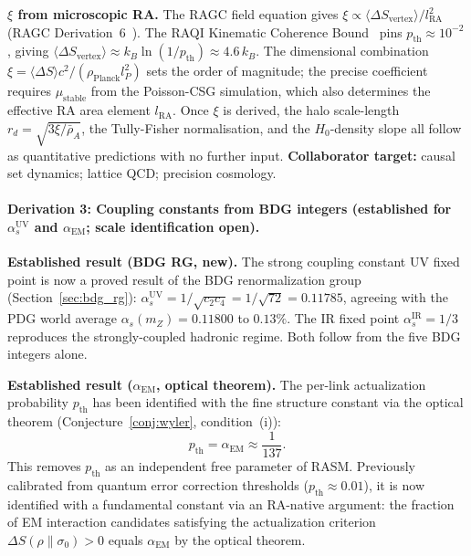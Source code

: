 \documentclass[11pt,a4paper]{article}
\begin{document}
\textbf{$\xi$ from microscopic RA.}
The RAGC field equation gives
$\xi \propto \langle\Delta S_{\mathrm{vertex}}\rangle / l_{\mathrm{RA}}^2$
(RAGC Derivation~6~\citep{Sandeman2026RAGC}).
The RAQI Kinematic Coherence Bound~\citep{Sandeman2026RAQI} pins
$p_{\mathrm{th}} \approx 10^{-2}$, giving
$\langle\Delta S_{\mathrm{vertex}}\rangle \approx k_B \ln(1/p_{\mathrm{th}})
\approx 4.6\,k_B$.
The dimensional combination $\xi = \langle\Delta S\rangle c^2 /
(\rho_{\mathrm{Planck}} l_P^2)$ sets the order of magnitude; the precise
coefficient requires $\mu_{\mathrm{stable}}$ from the Poisson-CSG simulation,
which also determines the effective RA area element $l_{\mathrm{RA}}$.
Once $\xi$ is derived, the halo scale-length $r_d = \sqrt{3\xi/\bar\rho_A}$,
the Tully-Fisher normalisation, and the $H_0$-density slope all follow as
quantitative predictions with no further input.
\textbf{Collaborator target:} causal set dynamics; lattice QCD; precision cosmology.


\paragraph{Derivation 3: Coupling constants from BDG integers (established for $\alpha_s^{\mathrm{UV}}$ and $\alpha_{\mathrm{EM}}$; scale identification open).}

\textbf{Established result (BDG RG, new).}
The strong coupling constant UV fixed point is now a proved result of the
BDG renormalization group (Section~\ref{sec:bdg_rg}):
$\alpha_s^{\mathrm{UV}} = 1/\sqrt{c_2 c_4} = 1/\sqrt{72} = 0.11785$,
agreeing with the PDG world average $\alpha_s(m_Z) = 0.11800$ to $0.13\%$.
The IR fixed point $\alpha_s^{\mathrm{IR}} = 1/3$ reproduces the
strongly-coupled hadronic regime. Both follow from the five BDG integers alone.

\textbf{Established result ($\alpha_{\mathrm{EM}}$, optical theorem).}
The per-link actualization probability $p_{\mathrm{th}}$ has been identified
with the fine structure constant via the optical theorem
(Conjecture~\ref{conj:wyler}, condition~(i)):
\begin{equation}
  p_{\mathrm{th}} = \alpha_{\mathrm{EM}} \approx \frac{1}{137}.
\end{equation}
This removes $p_{\mathrm{th}}$ as an independent free parameter of RASM.
Previously calibrated from quantum error correction thresholds ($p_{\mathrm{th}} \approx 0.01$),
it is now identified with a fundamental constant via an RA-native argument:
the fraction of EM interaction candidates satisfying the actualization
criterion $\Delta S(\rho\|\sigma_0) > 0$ equals $\alpha_{\mathrm{EM}}$ by
the optical theorem.
\end{document}
